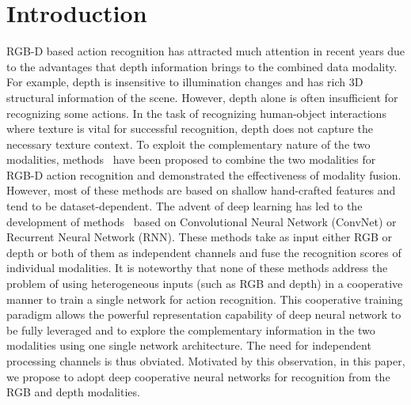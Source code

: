 \documentclass[letterpaper]{article} %
\begin{document}
\section{Introduction}
RGB-D based action recognition has attracted much attention in recent years due to the advantages that depth information brings to the combined data modality. For example, depth is insensitive to illumination changes and has rich 3D structural information of the scene. However, depth alone is often insufficient for recognizing some actions. In the task of recognizing human-object interactions where texture is vital for successful recognition, depth does not capture the necessary texture context. To exploit the complementary nature of the two modalities, methods~\cite{jia2014latent,Nie2015,Kong2015CVPR,hu2015jointly,wu2015watch,kong2017max} have been proposed to combine the two modalities for RGB-D action recognition and demonstrated the effectiveness of modality fusion. However, most of these methods are based on shallow hand-crafted features and tend to be dataset-dependent. The advent of deep learning has led to the development of methods~\cite{ji20133d,tran2015learning,simonyan2014two,pichao2015,pichaoTHMS,jayaraman2016slow,donahue2015long} based on Convolutional Neural Network (ConvNet) or Recurrent Neural Network (RNN). These methods take as input either RGB or depth or both of them as independent channels and fuse the recognition scores of individual modalities. It is noteworthy that none of these methods address the problem of using heterogeneous inputs (such as RGB and depth) in a cooperative manner to train a single network for action recognition. This cooperative training paradigm allows the powerful representation capability of deep neural network to be fully leveraged and to explore the complementary information in the two modalities using one single network architecture. The need for independent processing channels is thus obviated. Motivated by this observation, in this paper, we propose to adopt deep cooperative neural networks for recognition from the RGB and depth modalities.
\end{document}
